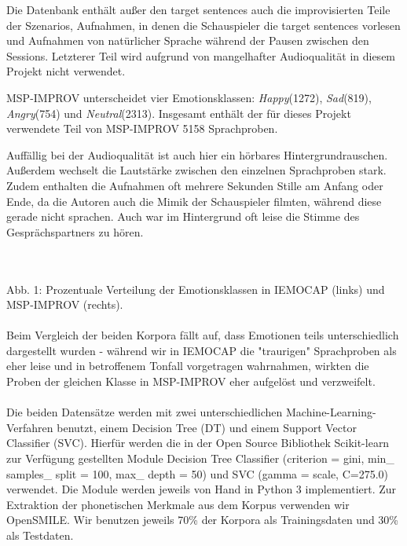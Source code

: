\documentclass{article} %
\begin{document}
Die Datenbank enthält außer den target sentences auch die improvisierten Teile der Szenarios, Aufnahmen, in denen die Schauspieler die target sentences vorlesen und Aufnahmen von natürlicher Sprache während der Pausen zwischen den Sessions. Letzterer Teil wird aufgrund von mangelhafter Audioqualität in diesem Projekt nicht verwendet. 

MSP-IMPROV unterscheidet vier Emotionsklassen: \emph{Happy}(1272), \emph{Sad}(819), \emph{Angry}(754) und \emph{Neutral}(2313). Insgesamt enthält der für dieses Projekt verwendete Teil von MSP-IMPROV 5158 Sprachproben. 

Auffällig bei der Audioqualität ist auch hier ein hörbares Hintergrundrauschen. Außerdem wechselt die Lautstärke zwischen den einzelnen Sprachproben stark. Zudem enthalten die Aufnahmen oft mehrere Sekunden Stille am Anfang oder Ende, da die Autoren auch die Mimik der Schauspieler filmten, während diese gerade nicht sprachen. Auch war im Hintergrund oft leise die Stimme des Gesprächspartners zu hören. \\ \\
 \\
Abb. 1: Prozentuale Verteilung der Emotionsklassen in IEMOCAP (links) und MSP-IMPROV (rechts). \\ \\
Beim Vergleich der beiden Korpora fällt auf, dass Emotionen teils unterschiedlich dargestellt wurden - während wir in IEMOCAP die "traurigen" Sprachproben als eher leise und in betroffenem Tonfall vorgetragen wahrnahmen, wirkten die Proben der gleichen Klasse in MSP-IMPROV eher aufgelöst und verzweifelt. \\ \\
Die beiden Datensätze werden mit zwei unterschiedlichen Machine-Learning-Verfahren benutzt, einem Decision Tree (DT) und einem Support Vector Classifier (SVC). Hierfür werden die in der Open Source Bibliothek Scikit-learn zur Verfügung gestellten Module Decision Tree Classifier (criterion = gini, min\_ samples\_ split = 100, max\_ depth = 50) und SVC (gamma = scale, C=275.0) verwendet. Die Module werden jeweils von Hand in Python 3 implementiert.  
Zur Extraktion der phonetischen Merkmale aus dem Korpus verwenden wir OpenSMILE. Wir benutzen jeweils 70\% der Korpora als Trainingsdaten und 30\% als Testdaten. 
\end{document}
